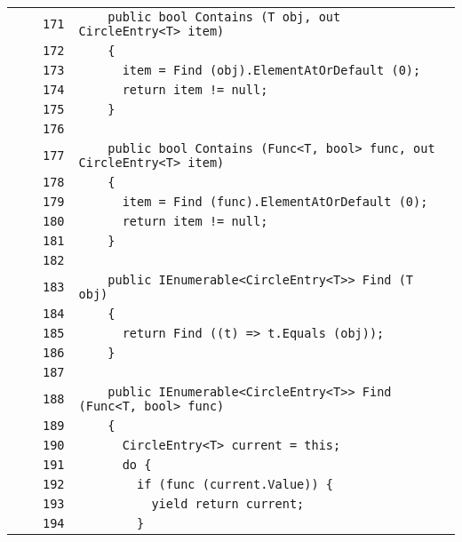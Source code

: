 \documentclass[a4paper,10pt]{article}
\begin{document}
\begin{longtable}[l]{lrrl}
\cellcolor{gray} &  & \verb~171~ & \verb~    public bool Contains (T obj, out CircleEntry<T> item)~\\
\cellcolor{gray} &  & \verb~172~ & \verb~    {~\\
\cellcolor{gray} &  & \verb~173~ & \verb~      item = Find (obj).ElementAtOrDefault (0);~\\
\cellcolor{gray} &  & \verb~174~ & \verb~      return item != null;~\\
\cellcolor{gray} &  & \verb~175~ & \verb~    }~\\
\cellcolor{gray} &  & \verb~176~ & \verb~~\\
\cellcolor{gray} &  & \verb~177~ & \verb~    public bool Contains (Func<T, bool> func, out CircleEntry<T> item)~\\
\cellcolor{gray} &  & \verb~178~ & \verb~    {~\\
\cellcolor{gray} &  & \verb~179~ & \verb~      item = Find (func).ElementAtOrDefault (0);~\\
\cellcolor{gray} &  & \verb~180~ & \verb~      return item != null;~\\
\cellcolor{gray} &  & \verb~181~ & \verb~    }~\\
\cellcolor{gray} &  & \verb~182~ & \verb~~\\
\cellcolor{gray} &  & \verb~183~ & \verb~    public IEnumerable<CircleEntry<T>> Find (T obj)~\\
\cellcolor{gray} &  & \verb~184~ & \verb~    {~\\
\cellcolor{gray} &  & \verb~185~ & \verb~      return Find ((t) => t.Equals (obj));~\\
\cellcolor{gray} &  & \verb~186~ & \verb~    }~\\
\cellcolor{gray} &  & \verb~187~ & \verb~~\\
\cellcolor{gray} &  & \verb~188~ & \verb~    public IEnumerable<CircleEntry<T>> Find (Func<T, bool> func)~\\
\cellcolor{gray} &  & \verb~189~ & \verb~    {~\\
\cellcolor{gray} &  & \verb~190~ & \verb~      CircleEntry<T> current = this;~\\
\cellcolor{gray} &  & \verb~191~ & \verb~      do {~\\
\cellcolor{gray} &  & \verb~192~ & \verb~        if (func (current.Value)) {~\\
\cellcolor{gray} &  & \verb~193~ & \verb~          yield return current;~\\
\cellcolor{gray} &  & \verb~194~ & \verb~        }~\\

\end{longtable}
\end{document}
